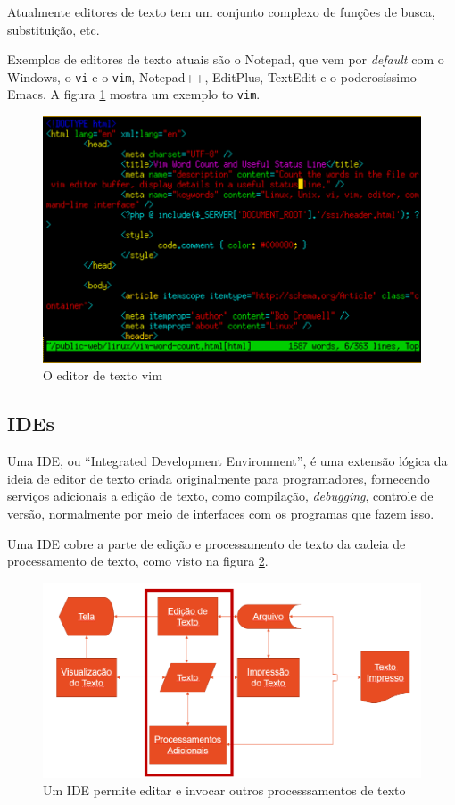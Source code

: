 Atualmente editores de texto tem um conjunto complexo de funções de busca, substituição, etc.

Exemplos de editores de texto atuais são o Notepad, que vem por \textit{default} com o Windows, o \texttt{vi} e o \texttt{vim}, Notepad++, EditPlus, TextEdit e o poderosíssimo Emacs. A figura \ref{fig:vim} mostra um exemplo to \texttt{vim}.


\begin{figure}[hbt]
    \centering
    \includegraphics[width=0.7\linewidth]{Images/vim}
    \caption{O editor de texto vim}
    \label{fig:vim}
\end{figure}


\subsection{IDEs}

Uma IDE, ou \enquote{Integrated Development Environment}, é uma extensão lógica da ideia de editor de texto criada originalmente para programadores, fornecendo serviços adicionais a edição de texto, como compilação, \textit{debugging}, controle de versão, normalmente por meio de interfaces com os programas que fazem isso.

Uma IDE cobre a parte de edição e processamento de texto da cadeia de processamento de texto, como visto na figura \ref{fig:ide:cadeia}.

\begin{figure}[hbt]
    \centering
    \includegraphics[width=0.7\linewidth]{Images/ide}
    \caption[Um IDE permite editar e invocar outros processsamentos de texto]{Um IDE permite editar e invocar outros processsamentos de texto}
    \label{fig:ide:cadeia}
\end{figure}



